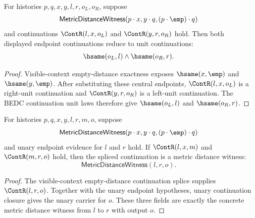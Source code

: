 \begin{theorem}
\label{thm:metric-visible-context-empty-distance-endpoint-continuation-units}
For histories $p,q,x,y,l,r,o_L,o_R$, suppose
$$
\mathsf{MetricDistanceWitness}(p\cdot x,y\cdot q,(p\cdot\emp)\cdot q)
$$
and continuations $\ContR(l,x,o_L)$ and $\ContR(y,r,o_R)$ hold. Then both
displayed endpoint continuations reduce to unit continuations:
$$
\hsame(o_L,l)\wedge\hsame(o_R,r).
$$
\end{theorem}
\begin{proof}
Visible-context empty-distance exactness exposes
$\hsame(x,\emp)$ and $\hsame(y,\emp)$. After substituting these central
endpoints, $\ContR(l,x,o_L)$ is a right-unit continuation and
$\ContR(y,r,o_R)$ is a left-unit continuation. The BEDC continuation unit laws
therefore give $\hsame(o_L,l)$ and $\hsame(o_R,r)$.
\end{proof}

\begin{theorem}
\label{thm:metric-distance-witness-visible-context-empty-distance-witness-splice}
For histories $p,q,x,y,l,r,m,o$, suppose
$$
\mathsf{MetricDistanceWitness}(p\cdot x,y\cdot q,(p\cdot\emp)\cdot q)
$$
and unary endpoint evidence for $l$ and $r$ hold. If
$\ContR(l,x,m)$ and $\ContR(m,r,o)$ hold, then the spliced continuation is a
metric distance witness:
$$
\mathsf{MetricDistanceWitness}(l,r,o).
$$
\end{theorem}
\begin{proof}
The visible-context empty-distance continuation splice supplies
$\ContR(l,r,o)$. Together with the unary endpoint hypotheses, unary
continuation closure gives the unary carrier for $o$. These three fields are
exactly the concrete metric distance witness from $l$ to $r$ with output $o$.
\end{proof}

